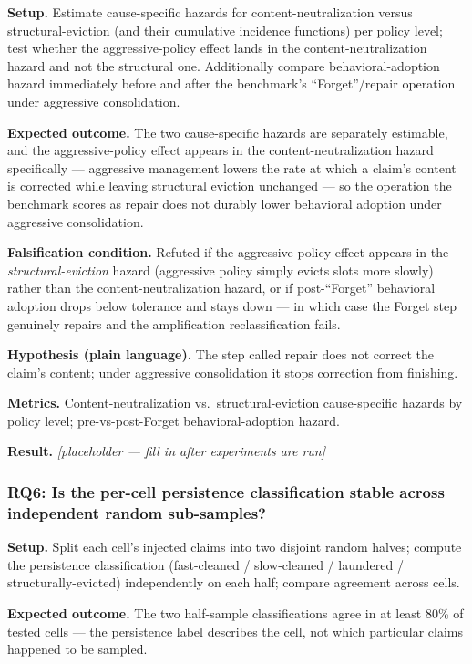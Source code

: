 \documentclass[11pt]{article}
\newcommand{\ph}{\textit{[placeholder --- fill in after experiments are run]}}
\begin{document}
\textbf{Setup.} Estimate cause-specific hazards for content-neutralization versus structural-eviction (and their cumulative incidence functions) per policy level; test whether the aggressive-policy effect lands in the content-neutralization hazard and not the structural one. Additionally compare behavioral-adoption hazard immediately before and after the benchmark's ``Forget''/repair operation under aggressive consolidation.

\textbf{Expected outcome.} The two cause-specific hazards are separately estimable, and the aggressive-policy effect appears in the content-neutralization hazard specifically --- aggressive management lowers the rate at which a claim's content is corrected while leaving structural eviction unchanged --- so the operation the benchmark scores as repair does not durably lower behavioral adoption under aggressive consolidation.

\textbf{Falsification condition.} Refuted if the aggressive-policy effect appears in the \emph{structural-eviction} hazard (aggressive policy simply evicts slots more slowly) rather than the content-neutralization hazard, or if post-``Forget'' behavioral adoption drops below tolerance and stays down --- in which case the Forget step genuinely repairs and the amplification reclassification fails.

\textbf{Hypothesis (plain language).} The step called repair does not correct the claim's content; under aggressive consolidation it stops correction from finishing.

\textbf{Metrics.} Content-neutralization vs.\ structural-eviction cause-specific hazards by policy level; pre-vs-post-Forget behavioral-adoption hazard.

\textbf{Result.} \ph

\subsubsection*{RQ6: Is the per-cell persistence classification stable across independent random sub-samples?}

\textbf{Setup.} Split each cell's injected claims into two disjoint random halves; compute the persistence classification (fast-cleaned / slow-cleaned / laundered / structurally-evicted) independently on each half; compare agreement across cells.

\textbf{Expected outcome.} The two half-sample classifications agree in at least 80\% of tested cells --- the persistence label describes the cell, not which particular claims happened to be sampled.
\end{document}
